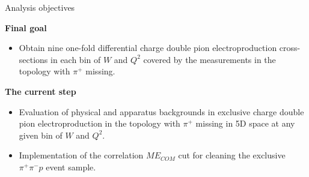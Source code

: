 \begin{frame}{Analysis objectives}

    \textcolor{myblue}{\textbf{\large Final goal}}
    
    \begin{itemize}
        \item Obtain nine one-fold differential charge double pion electroproduction
        cross-sections in each bin of $W$ and $Q^2$ covered by the measurements
        in the topology with $\pi^+$ missing.
    \end{itemize}
    
    \vspace{0.5cm}
    
    \textcolor{myblue}{\textbf{\large The current step}}
    
    \begin{itemize}
        \item Evaluation of physical and apparatus backgrounds in exclusive charge
        double pion electroproduction in the topology with $\pi^+$ missing
        in 5D space at any given bin of $W$ and $Q^2$.
    
        \item Implementation of the correlation $ME_{COM}$ cut for cleaning
        the exclusive $\pi^+\pi^-\!p$ event sample.
\end{itemize}

\end{frame}

